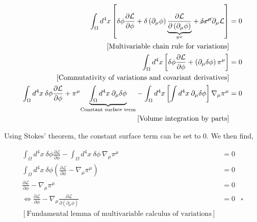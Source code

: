 \documentclass{beamer}
\begin{document}
\begin{frame}
\begin{align*}
\int_\Omega d^4 x \left[ \delta \phi \frac{\partial \mathcal{L}}{\partial \phi} + \delta \left( \partial_\mu \phi \right) \underset{\pi^\mu}{\underbrace{\frac{\partial \mathcal{L}}{\partial \left( \partial_\mu \phi \right)}}} + \cancel{\delta x^\mu} \partial_\mu \mathcal{L} \right] & = 0 \\
\left[ \text{Multivariable chain rule for variations} \right] \\
\int_\Omega d^4 x \left[ \delta \phi \frac{\partial \mathcal{L}}{\partial \phi} + \left( \partial_\mu \delta \phi \right) \pi^\mu \right] & = 0 \\
\left[ \text{Commutativity of variations and covariant derivatives} \right] \\
\int_\Omega d^4 x \: \delta \phi \frac{\partial \mathcal{L}}{\partial \phi} + \pi^\mu \underset{\text{Constant surface term}}{\underbrace{\int_\Omega d^4 x \: \partial_\mu \delta \phi}} - \int_\Omega d^4 x \left[ \int d^4 x \: \partial_\mu \delta \phi \right] \nabla_\mu \pi^\mu & = 0 \\
\left[ \text{Volume integration by parts} \right] \\
\end{align*}
\end{frame}

\begin{frame}
Using Stokes' theorem, the constant surface term can be set to $0$. We then find,

\begin{align*}
\int_\Omega d^4 x \: \delta \phi \frac{\partial \mathcal{L}}{\partial \phi} - \int_\Omega d^4 x \: \delta \phi \: \nabla_\mu \pi^\mu & = 0 \\
\int_\Omega d^4 x \: \delta \phi \left( \frac{\partial \mathcal{L}}{\partial \phi} - \nabla_\mu \pi^\mu \right) & = 0 \\
\frac{\partial \mathcal{L}}{\partial \phi} - \nabla_\mu \pi^\mu & = 0 \\
\Longleftrightarrow \frac{\partial \mathcal{L}}{\partial \phi} - \nabla_\mu \frac{\partial \mathcal{L}}{\partial \left( \partial_\mu \phi \right)} & = 0 & \square \\
\left[ \text{Fundamental lemma of multivariable calculus of variations} \right]
\end{align*}
\end{frame}
\end{document}
